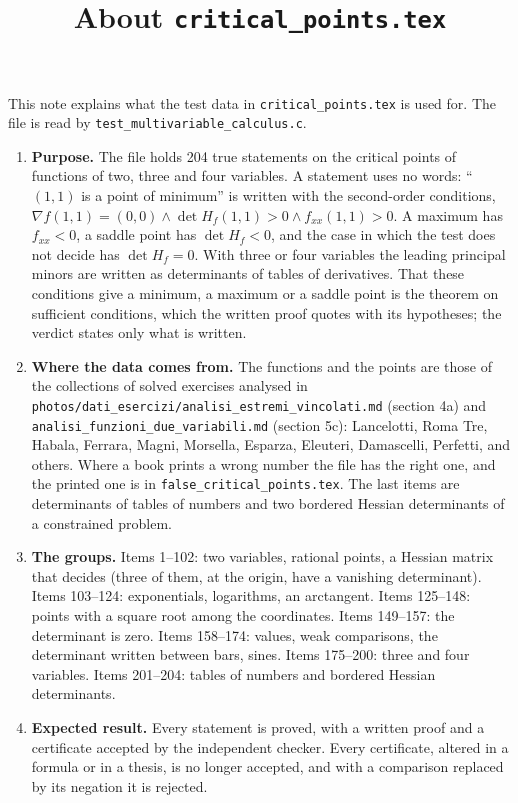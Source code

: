 \documentclass[11pt,a4paper]{article}
\title{About \texttt{critical\_points.tex}}
\author{}
\date{}
\begin{document}
\maketitle
This note explains what the test data in \texttt{critical\_points.tex} is used for. The file is read by \texttt{test\_multivariable\_calculus.c}.

\begin{enumerate}
\item \textbf{Purpose.} The file holds 204 true statements on the critical points of functions of two, three and four variables. A statement uses no words: ``$(1, 1)$ is a point of minimum'' is written with the second-order conditions, $\nabla f(1, 1) = (0, 0) \land \det H_{f}(1, 1) > 0 \land f_{xx}(1, 1) > 0$. A maximum has $f_{xx} < 0$, a saddle point has $\det H_{f} < 0$, and the case in which the test does not decide has $\det H_{f} = 0$. With three or four variables the leading principal minors are written as determinants of tables of derivatives. That these conditions give a minimum, a maximum or a saddle point is the theorem on sufficient conditions, which the written proof quotes with its hypotheses; the verdict states only what is written.

\item \textbf{Where the data comes from.} The functions and the points are those of the collections of solved exercises analysed in \texttt{photos/dati\_esercizi/analisi\_estremi\_vincolati.md} (section 4a) and \texttt{analisi\_funzioni\_due\_variabili.md} (section 5c): Lancelotti, Roma Tre, Habala, Ferrara, Magni, Morsella, Esparza, Eleuteri, Damascelli, Perfetti, and others. Where a book prints a wrong number the file has the right one, and the printed one is in \texttt{false\_critical\_points.tex}. The last items are determinants of tables of numbers and two bordered Hessian determinants of a constrained problem.

\item \textbf{The groups.} Items 1--102: two variables, rational points, a Hessian matrix that decides (three of them, at the origin, have a vanishing determinant). Items 103--124: exponentials, logarithms, an arctangent. Items 125--148: points with a square root among the coordinates. Items 149--157: the determinant is zero. Items 158--174: values, weak comparisons, the determinant written between bars, sines. Items 175--200: three and four variables. Items 201--204: tables of numbers and bordered Hessian determinants.

\item \textbf{Expected result.} Every statement is proved, with a written proof and a certificate accepted by the independent checker. Every certificate, altered in a formula or in a thesis, is no longer accepted, and with a comparison replaced by its negation it is rejected.


\end{enumerate}
\end{document}
